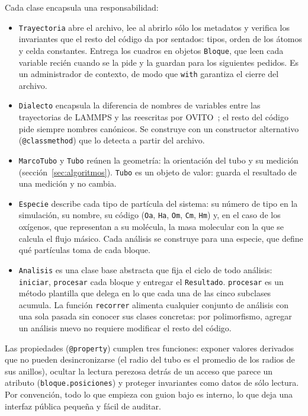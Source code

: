 \documentclass[11pt,a4paper]{article}
\begin{document}
Cada clase encapsula una responsabilidad:



\begin{itemize}
    \item \texttt{Trayectoria} abre el archivo, lee al abrirlo sólo los
    metadatos y verifica los invariantes que el resto del código da por
    sentados: tipos, orden de los átomos y celda constantes. Entrega los
    cuadros en objetos \texttt{Bloque}, que leen cada variable recién cuando
    se la pide y la guardan para los siguientes pedidos. Es un administrador
    de contexto, de modo que \texttt{with} garantiza el cierre del archivo.

    \item \texttt{Dialecto} encapsula la diferencia de nombres de variables
    entre las trayectorias de LAMMPS y las reescritas por
    OVITO~\cite{ovito}; el resto del código pide siempre nombres canónicos.
    Se construye con un constructor alternativo (\texttt{@classmethod}) que
    lo detecta a partir del archivo.

    \item \texttt{MarcoTubo} y \texttt{Tubo} reúnen la geometría: la
    orientación del tubo y su medición (sección~\ref{sec:algoritmos}).
    \texttt{Tubo} es un objeto de valor: guarda el resultado de una medición
    y no cambia.

    \item \texttt{Especie} describe cada tipo de partícula del sistema: su
    número de tipo en la simulación, su nombre, su código (\texttt{Oa},
    \texttt{Ha}, \texttt{Om}, \texttt{Cm}, \texttt{Hm}) y, en el caso de los
    oxígenos, que representan a su molécula, la masa molecular con la que se
    calcula el flujo másico. Cada análisis se construye para una especie, que
    define qué partículas toma de cada bloque.

    \item \texttt{Analisis} es una clase base abstracta que fija el ciclo de
    todo análisis: \texttt{iniciar}, \texttt{procesar} cada bloque y entregar
    el \texttt{Resultado}. \texttt{procesar} es un método plantilla que
    delega en lo que cada una de las cinco subclases acumula. La función
    \texttt{recorrer} alimenta cualquier conjunto de análisis con una sola
    pasada sin conocer sus clases concretas: por polimorfismo, agregar un
    análisis nuevo no requiere modificar el resto del código.
\end{itemize}

Las propiedades (\texttt{@property}) cumplen tres funciones: exponer valores
derivados que no pueden desincronizarse (el radio del tubo es el promedio de
los radios de sus anillos), ocultar la lectura perezosa detrás de un acceso
que parece un atributo (\texttt{bloque.posiciones}) y proteger invariantes
como datos de sólo lectura. Por convención, todo lo que empieza con guion
bajo es interno, lo que deja una interfaz pública pequeña y fácil de
auditar.
\end{document}
